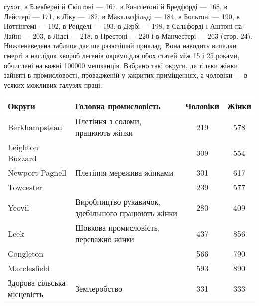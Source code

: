 \parcont{}  %
сухот, в Блекберні й Скіптоні — 167, в Конглетоні й Бредфорді —
168, в Лейстері — 171, в Ліку — 182, в Маккльсфільді — 184,
в Больтоні — 190, в Ноттінгемі — 192, в Ронделі — 193, в Дербі —
198, в Сальфорді і Аштоні-на-Лайні — 203, в Лідсі — 218, в Престоні — 220 і в Манчестері — 263
(стор. 24). Нижченаведена таблиця дає ще разючіший приклад. Вона наводить випадки смерті
в наслідок хвороб легенів окремо для обох статей між 15 і
25 роками, обчислені на кожні \num{100000} мешканців. Вибрано такі
округи, де тільки жінки зайняті в промисловості, провадженій
у закритих приміщеннях, а чоловіки — в усяких можливих галузях праці.

\begin{table}[H]
  \centering
  \small
  \begin{tabular}{l l c c}
    \toprule
    Округи &
    Головна промисловість &
    Чоловіки & Жінки \\
    \midrule

Berkhampstead    & Плетіння з соломи, працюють жінки & 219 & 578 \\
Leighton Buzzard  &                                       & 309 & 554 \\
Newport Pagnell  & Плетіння мережива жінками         & 301 & 617 \\
Towcester        &                                        & 239 & 577 \\
Yeovil           & \makecell[lb]{Виробництво рукавичок,\\здебільшого працюють жінки} & 280 & 409 \\
Leek             & \makecell[lb]{Шовкова промисловість, \\ переважно жінки} & 437 & 856 \\
Congleton        &                                             & 566 & 790 \\
Macclesfield     &                                             & 593 & 890 \\
\makecell[lb]{Здорова сільська \\ місцевість} &   Землеробство                         & 331 & 333 \\
  \end{tabular}
\end{table}

